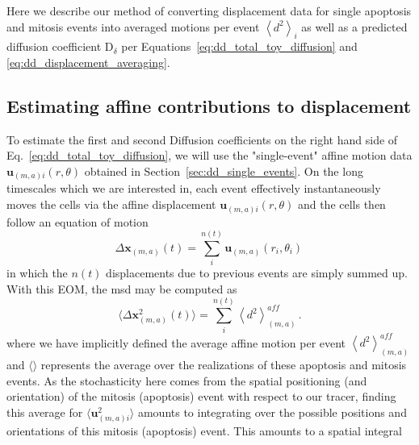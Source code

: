 \documentclass[
reprint
,aps
,amssymb
,amsmath
,superscriptaddress
]{revtex4-1}
\begin{document}
Here we describe our method of converting displacement data for single apoptosis and mitosis events into averaged motions per event $ \left\langle d^2 \right\rangle_i$ as well as a predicted diffusion coefficient $\mathrm{D}_\delta$ per Equations~\ref{eq:dd_total_toy_diffusion} and \ref{eq:dd_displacement_averaging}.


\subsection{Estimating affine contributions to displacement}\label{subapp:affine_displacements}
To estimate the first and second Diffusion coefficients on the right hand side of Eq.~\ref{eq:dd_total_toy_diffusion}, we will use the "single-event" affine motion data $\mathbf{u}_{(m,a)i}(r, \theta)$ obtained in Section~\ref{sec:dd_single_events}. On the long timescales which we are interested in, each event effectively instantaneously moves the cells via the affine displacement $\mathbf{u}_{(m,a)i}(r, \theta)$ and the cells then follow an equation of motion
%
\begin{equation}\label{eq:app_affine_dynamics}
\Delta \mathbf{x}_{(m,a)}(t) = \sum_{i}^{n(t)} \mathbf{u}_{(m,a)}(r_i, \theta_i) \, 
\end{equation}
%
in which the $n(t)$ displacements due to previous events are simply summed up. 
With this EOM, the msd may be computed as
%
\begin{equation}\label{eq:app_affine_msd}
\langle\Delta \mathbf{x}^2_{(m,a)}(t)\rangle = \sum_{i}^{n(t)} \left \langle d^2 \right\rangle^{aff}_{(m,a)} \, .
\end{equation}
%
where we have implicitly defined the average affine motion per event $\left \langle d^2 \right\rangle^{aff}_{(m,a)}$ and $\langle \rangle$ represents the average over the realizations of these apoptosis and mitosis events. As the stochasticity here comes from the spatial positioning (and orientation) of the mitosis (apoptosis) event with respect to our tracer, finding this average for $ \langle\mathbf{u}^2_{(m,a)i}\rangle $ amounts to integrating over the possible positions and orientations of this mitosis (apoptosis) event. This amounts to a spatial integral
\end{document}
